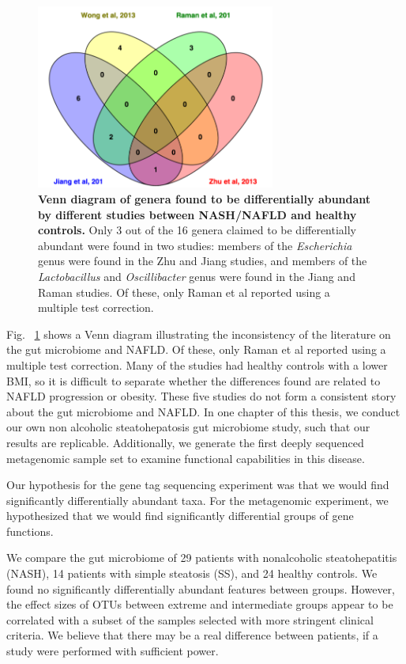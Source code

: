 \begin{figure}[h]
\begin{center}
\includegraphics[width=0.7\textwidth]{nafld_papers.png}
\caption[Venn diagram of genera found to be differentially abundant by different studies between NASH/NAFLD and healthy controls.]{\textbf{Venn diagram of genera found to be differentially abundant by different studies between NASH/NAFLD and healthy controls.} Only 3 out of the 16 genera claimed to be differentially abundant were found in two studies: members of the \textit{Escherichia} genus were found in the Zhu \cite{zhu2013characterization} and Jiang \cite{jiang2015dysbiosis} studies, and members of the \textit{Lactobacillus} and \textit{Oscillibacter} genus were found in the Jiang \cite{jiang2015dysbiosis} and Raman \cite{raman2013fecal} studies. Of these, only Raman et al \cite{raman2013fecal} reported using a multiple test correction.}
\label{introduction_nafld_fig1}
\end{center}
\end{figure}

Fig. ~\ref{introduction_nafld_fig1} shows a Venn diagram illustrating the inconsistency of the literature on the gut microbiome and NAFLD. Of these, only Raman et al \cite{raman2013fecal} reported using a multiple test correction. Many of the studies had healthy controls with a lower BMI, so it is difficult to separate whether the differences found are related to NAFLD progression or obesity. These five studies do not form a consistent story about the gut microbiome and NAFLD. In one chapter of this thesis, we conduct our own non alcoholic steatohepatosis gut microbiome study, such that our results are replicable. Additionally, we generate the first deeply sequenced metagenomic sample set to examine functional capabilities in this disease.

Our hypothesis for the gene tag sequencing experiment was that we would find significantly differentially abundant taxa. For the metagenomic experiment, we hypothesized that we would find significantly differential groups of gene functions.

We compare the gut microbiome of 29 patients with nonalcoholic steatohepatitis (NASH), 14 patients with simple steatosis (SS), and 24 healthy controls. We found no significantly differentially abundant features between groups. However, the effect sizes of OTUs between extreme and intermediate groups appear to be correlated with a subset of the samples selected with more stringent clinical criteria. We believe that there may be a real difference between patients, if a study were performed with sufficient power.